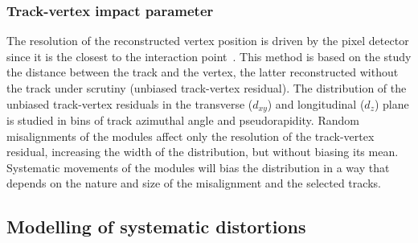 \subsubsection{Track-vertex impact parameter} %
The resolution of the reconstructed vertex position is driven by the pixel detector
since it is the closest to the interaction point~\cite{CMS-TRK-11-002}.
This method is based on the study the distance between the track and the vertex,
the latter reconstructed without the track under scrutiny (unbiased track-vertex residual).
The distribution of the unbiased track-vertex residuals in the transverse ($d_{xy}$) and longitudinal ($d_z$)
plane is studied in bins of track azimuthal angle and pseudorapidity.
Random misalignments of the modules affect only the resolution of the track-vertex residual,
increasing the width of the distribution, but without biasing its mean.
Systematic movements of the modules will bias the distribution
in a way that depends on the nature and size of the misalignment and the selected tracks.

\subsection{Modelling of systematic distortions}

\cite{CMS-TRK-20-001}
